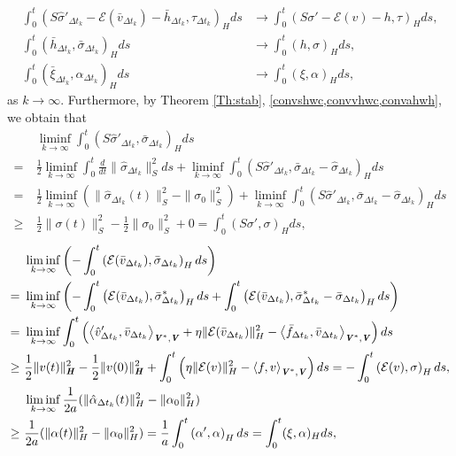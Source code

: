 \documentclass[11pt, a4paper]{article}
\newcommand{\dt}{{\Delta t}}
\newcommand{\E}{{\mathcal{E}}}
\newcommand{\bm}[1]{\textbf{\textit{#1}}}%
\newcommand{\Hv}{{\bm{H}}}
\newcommand{\Vv}{{\bm{V}}}
\newcommand{\Hs}{{H}}
\newcommand{\blaket}[2]{ \left\langle {#1},{#2}\right\rangle_{\Vv^*,\Vv} }
\begin{document}
\[\begin{aligned}
    \int_0^t \left(S\hat{\sigma}'_{\dt_k} - \E(\bar{v}_{\dt_k}) - \bar{h}_{\dt_k}, \tau_{\dt_k}\right)_\Hs ds
    &\rightarrow \int_0^t \left(S\sigma' - \E(v) - h,\tau\right)_\Hs ds,\\
    \int_0^t \left(\bar{h}_{\dt_k}, 
    \bar{\sigma}_{\dt_k}\right)_\Hs ds
    &\rightarrow \int_0^t (h, \sigma)_\Hs ds,\\
    \int_0^t (\bar{\xi}_{\dt_k}, \alpha_{\dt_k})_\Hs ds
    &\rightarrow \int_0^t (\xi, \alpha)_\Hs ds,
\end{aligned}\] 
as $k \rightarrow \infty$. 
Furthermore, by Theorem \ref{Th:stab}, \cref{convshwc,convvhwc,convahwh}, we obtain that
\[\begin{aligned}
    &\liminf_{k\rightarrow\infty}
    \int_0^t \left(S\hat{\sigma}'_{\dt_k}, 
    \bar{\sigma}_{\dt_k}\right)_\Hs ds\\
    =~& \frac{1}{2}\liminf_{k\rightarrow\infty}
    \int_0^t \frac{d}{dt}\|\hat{\sigma}_{\dt_k}\|_S^2ds
    +\liminf_{k\rightarrow\infty}
    \int_0^t \left(S\hat{\sigma}'_{\dt_k}, 
    \bar{\sigma}_{\dt_k}-\hat{\sigma}_{\dt_k}\right)_\Hs ds\\
    =~& \frac{1}{2}\liminf_{k\rightarrow\infty}
    (\|\hat{\sigma}_{\dt_k}(t)\|_S^2 - \|\sigma_0\|_S^2)
    + \liminf_{k\rightarrow\infty}
    \int_0^t \left(S\hat{\sigma}'_{\dt_k}, 
    \bar{\sigma}_{\dt_k}-\hat{\sigma}_{\dt_k}\right)_\Hs ds\\
    \ge~& \frac{1}{2}\|\sigma(t)\|_S^2
    - \frac{1}{2}\|\sigma_0\|_S^2 + 0
    = \int_0^t \left(S\sigma', \sigma\right)_\Hs ds,
\end{aligned}\]
\[\begin{aligned}
    &\liminf_{k\rightarrow\infty}
    \left(-\int_0^t \left(\E(\bar{v}_{\dt_k}), 
    \bar{\sigma}_{\dt_k}\right)_\Hs ds\right)\\
    =~& \liminf_{k\rightarrow\infty}
    \left(-\int_0^t \left(\E(\bar{v}_{\dt_k}), 
    \bar{\sigma}^*_{\dt_k}\right)_\Hs ds
    + \int_0^t \left(\E(\bar{v}_{\dt_k}), 
    \bar{\sigma}^*_{\dt_k} - \bar{\sigma}_{\dt_k}\right)_\Hs ds\right)
    \\
    =~& \liminf_{k\rightarrow\infty}
    \int_0^t\left(\blaket{\hat{v}'_{\dt_k}}{\bar{v}_{\dt_k}}
    + \eta\|\E(\bar{v}_{\dt_k})\|_\Hs^2
    - \blaket{\bar{f}_{\dt_k}}{\bar{v}_{\dt_k}} \right)ds\\
    \ge~& \frac{1}{2}\|v(t)\|_\Hv^2 
    - \frac{1}{2}\|v(0)\|_\Hv^2
    + \int_0^t\left(\eta\|\E(v)\|_\Hs^2
    - \blaket{f}{v} \right)ds
    = -\int_0^t \left(\E(v), \sigma\right)_\Hs ds,\\
    & \liminf_{k\rightarrow\infty}\frac{1}{2a}(\|\hat{\alpha}_{\dt_k}(t)\|_\Hs^2 - \|\alpha_0\|_\Hs^2)\\
    \ge~& \frac{1}{2a}(\|\alpha(t)\|_\Hs^2 - \|\alpha_0\|_\Hs^2)
    = \frac{1}{a}\int_0^t \left(\alpha', \alpha\right)_\Hs ds
    = \int_0^t (\xi, \alpha)_\Hs ds,
\end{aligned}\]
\end{document}

